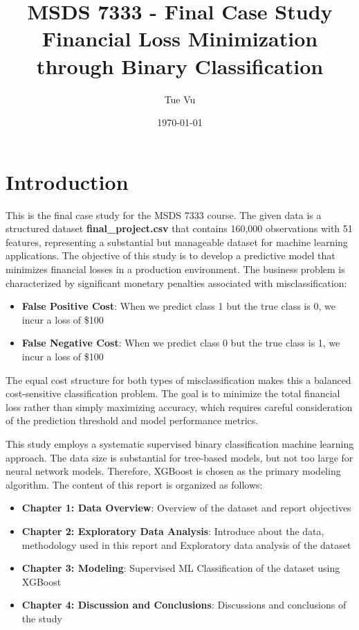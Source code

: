 \documentclass[12pt,a4paper]{report}
\title{\textbf{MSDS 7333 - Final Case Study \\ Financial Loss Minimization \\ through Binary Classification}}
\author{Tue Vu}
\date{\today}
\begin{document}
\maketitle

\newpage

\chapter{Introduction}

This is the final case study for the MSDS 7333 course. 
The given data is a structured dataset \textbf{final\_project.csv} that contains 160,000 observations with 51 features, representing a substantial but manageable dataset for machine learning applications.
The objective of this study is to develop a predictive model that minimizes financial losses in a production environment. The business problem is characterized by significant monetary penalties associated with misclassification:

\begin{itemize}
    \item \textbf{False Positive Cost}: When we predict class 1 but the true class is 0, we incur a loss of \$100
    \item \textbf{False Negative Cost}: When we predict class 0 but the true class is 1, we incur a loss of \$100
\end{itemize}

The equal cost structure for both types of misclassification makes this a balanced cost-sensitive classification problem. The goal is to minimize the total financial loss rather than simply maximizing accuracy, which requires careful consideration of the prediction threshold and model performance metrics.

This study employs a systematic supervised binary classification machine learning approach.
The data size is substantial for tree-based models, but not too large for neural network models. Therefore, XGBoost is chosen as the primary modeling algorithm.
The content of this report is organized as follows:
\begin{itemize}
    \item \textbf{Chapter 1: Data Overview}: Overview of the dataset and report objectives
    \item \textbf{Chapter 2: Exploratory Data Analysis}: Introduce about the data, methodology used in this report and Exploratory data analysis of the dataset
    \item \textbf{Chapter 3: Modeling}: Supervised ML Classification of the dataset using XGBoost
    \item \textbf{Chapter 4: Discussion and Conclusions}: Discussions and conclusions of the study
\end{itemize}
\end{document}
